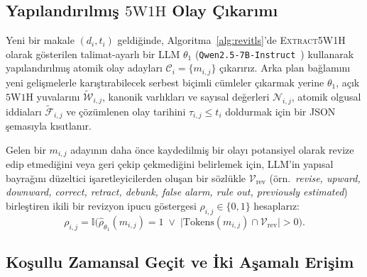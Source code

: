 ﻿\documentclass[journal]{IEEEtran}
\begin{document}
\subsection{Yap{\i}land{\i}r{\i}lm{\i}\c{s} $5\text{W}1\text{H}$ Olay \c{C}{\i}kar{\i}m{\i}}
\label{subsec:extraction}

Yeni bir makale $(d_i, t_i)$ geldi\u{g}inde, Algoritma~\ref{alg:revitls}'de \textsc{Extract5W1H} olarak g\"{o}sterilen talimat-ayarl{\i} bir LLM $\theta_1$ (\texttt{Qwen2.5-7B-Instruct}~\cite{qwen25}) kullanarak yap{\i}land{\i}r{\i}lm{\i}\c{s} atomik olay adaylar{\i} $\mathcal{C}_i = \{m_{i,j}\}$ \c{c}{\i}kar{\i}r{\i}z. Arka plan ba\u{g}lam{\i}n{\i} yeni geli\c{s}melerle kar{\i}\c{s}t{\i}rabilecek serbest bi\c{c}imli c\"{u}mleler \c{c}{\i}karmak yerine $\theta_1$, a\c{c}{\i}k $5\text{W}1\text{H}$ yuvalar{\i}n{\i} $\tilde{\mathcal{W}}_{i,j}$, kanonik varl{\i}klar{\i} ve say{\i}sal de\u{g}erleri $\mathcal{N}_{i,j}$, atomik olgusal iddialar{\i} $\tilde{\mathcal{F}}_{i,j}$ ve \c{c}\"{o}z\"{u}mlenen olay tarihini $\tau_{i,j} \le t_i$ doldurmak i\c{c}in bir JSON \c{s}emas{\i}yla k{\i}s{\i}tlan{\i}r.

Gelen bir $m_{i,j}$ aday{\i}n{\i}n daha \"{o}nce kaydedilmi\c{s} bir olay{\i} potansiyel olarak revize edip etmedi\u{g}ini veya geri \c{c}ekip \c{c}ekmedi\u{g}ini belirlemek i\c{c}in, LLM'in yap{\i}sal bayra\u{g}{\i}n{\i} d\"{u}zeltici i\c{s}aretleyicilerden olu\c{s}an bir s\"{o}zl\"{u}kle $\mathcal{V}_{\text{rev}}$ (\"{o}rn.\ \textit{revise, upward, downward, correct, retract, debunk, false alarm, rule out, previously estimated}) birle\c{s}tiren ikili bir revizyon ipucu g\"{o}stergesi $\rho_{i,j} \in \{0, 1\}$ hesaplar{\i}z:
\begin{equation}
\rho_{i,j} = \mathbb{I}\Big( \hat{\rho}_{\theta_1}(m_{i,j}) = 1 \;\lor\; \big|\text{Tokens}(m_{i,j}) \cap \mathcal{V}_{\text{rev}}\big| > 0 \Big).
\label{eq:rev_cue}
\end{equation}

\subsection{Ko\c{s}ullu Zamansal Ge\c{c}it ve \.{I}ki A\c{s}amal{\i} Eri\c{s}im}
\label{subsec:retrieval}
\end{document}
